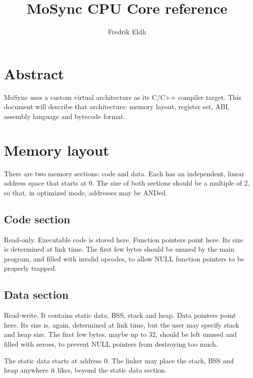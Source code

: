 \documentclass {article}
\title{MoSync CPU Core reference}
\author{Fredrik Eldh}
\begin{document}
\maketitle


\setcounter{page}{1}
\pagestyle{fancy}


\section{Abstract}

MoSync uses a custom virtual architecture as its C/C++ compiler target.
This document will describe that architecture:
memory layout, register set, ABI, assembly language and bytecode format.


\section{Memory layout}

There are two memory sections: code and data.
Each has an independent, linear address space that starts at 0.
The size of both sections should be a multiple of 2, so that, in optimized mode,
addresses may be ANDed.

\subsection{Code section}

Read-only. Executable code is stored here.
Function pointers point here.
Its size is determined at link time.
The first few bytes should be unused by the main program, and filled with invalid opcodes,
to allow NULL function pointers to be properly trapped.

\subsection{Data section}

Read-write. It contains static data, BSS, stack and heap.
Data pointers point here.
Its size is, again, determined at link time, but the user may specify stack and heap size.
The first few bytes, maybe up to 32, should be left unused and filled with zeroes,
to prevent NULL pointers from destroying too much.

The static data starts at address 0.
The linker may place the stack, BSS and heap anywhere it likes, beyond the static data section.
\end{document}
